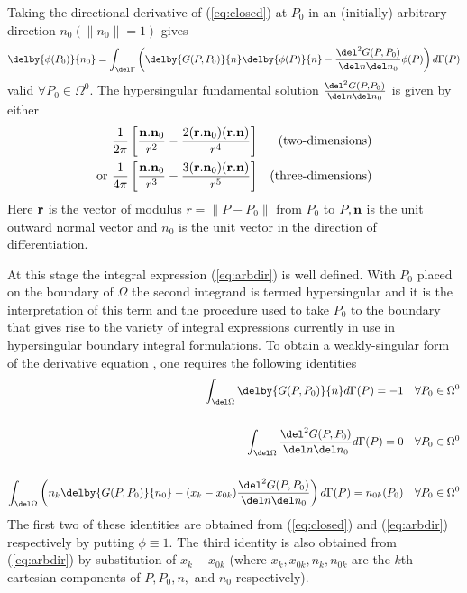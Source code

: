 Taking the directional derivative of (\ref{eq:closed}) at $P_{0}$ in an
(initially) arbitrary direction $n_{0} (\parallel n_{0}\parallel =1)$ gives
\begin{equation}       
  \delby{\phi(P_{0})}{n_{0}} = \int_{\del\Gamma}\left(\delby{G(P,P_{0})}{n}
    \delby{\phi(P)}{n}-\frac{\del^{2}G(P,P_{0})}{\del n\del n_{0}}
    \phi(P)\right)d\Gamma(P)
 \label{eq:arbdir}
\end{equation} 
valid $\forall P_{0}\in \Omega^{0}$.  The hypersingular fundamental solution
$\frac{\del^{2}G(P,P_{0})}{\del n\del n_{0}}$ is given by either
\begin{eqnarray*}
  &\frac{1}{2\pi}\left[\frac{{\bf n.n}_{0}}{r^{2}}-\frac{2({\bf r.n}_{0})
      ({\bf r.n})}{r^{4}}\right] & \mbox{(two-dimensions)}\\ \mbox{or
    }&\frac{1}{4\pi}\left[\frac{{\bf n.n}_{0}}{r^{3}} -\frac{3({\bf r.n}_{0})
      ({\bf r.n})}{r^{5}}\right] & \mbox{(three-dimensions)}
\end{eqnarray*}
Here ${\bf r}$ is the vector of modulus $r = \parallel P-P_{0}\parallel$ from
$P_{0}$ to $P, {\bf n}$ is the unit outward normal vector and $n_{0}$ is the
unit vector in the direction of differentiation.

At this stage the integral expression (\ref{eq:arbdir}) is well defined.  With
$P_{0}$ placed on the boundary of $\Omega$ the second integrand is termed
hypersingular and it is the interpretation of this term and the procedure used
to take $P_{0}$ to the boundary that gives rise to the variety of integral
expressions currently in use in hypersingular boundary integral formulations.
To obtain a weakly-singular form of the derivative equation , one requires the
following identities
\begin{eqnarray}
 \int_{\del\Omega}\delby{G(P,P_{0})}{n}d\Gamma(P)=-1 & & 
  \forall P_{0}\in \Omega^{0}\\
 \nonumber\\
 \int_{\del\Omega}\frac{\del^{2}G(P,P_{0})}{\del n\del n_{0}}d\Gamma(P)=0  & & \forall P_{0}\in \Omega^{0}\\
 \nonumber\\
 \int_{\del\Omega}\left(n_{k}\delby{G(P,P_{0})}{n_{0}}-(x_{k}-x_{0k})
  \frac{\del^{2}G(P,P_{0})}{\del n\del n_{0}}\right)d\Gamma(P)=
  n_{0k}(P_{0}) & & 
  \forall P_{0}\in \Omega^{0}
\end{eqnarray}
The first two of these identities are obtained from (\ref{eq:closed}) and
(\ref{eq:arbdir}) respectively by putting $\phi \equiv 1$.  The third identity
is also obtained from (\ref{eq:arbdir}) by substitution of $x_{k}-x_{0k}$
(where $x_{k}, x_{0k}, n_{k}, n_{0k}$ are the $k$th cartesian components of
$P, P_{0}, n,$ and $n_{0}$ respectively).

